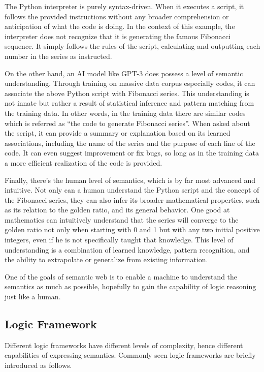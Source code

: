 The Python interpreter is purely syntax-driven. When it executes a script, it follows the provided instructions without any broader comprehension or anticipation of what the code is doing. In the context of this example, the interpreter does not recognize that it is generating the famous Fibonacci sequence. It simply follows the rules of the script, calculating and outputting each number in the series as instructed.

On the other hand, an AI model like GPT-3 does possess a level of semantic understanding. Through training on massive data corpus especially codes, it can associate the above Python script with Fibonacci series. This understanding is not innate but rather a result of statistical inference and pattern matching from the training data. In other words, in the training data there are similar codes which is referred as ``the code to generate Fibonacci series''. When asked about the script, it can provide a summary or explanation based on its learned associations, including the name of the series and the purpose of each line of the code. It can even suggest improvement or fix bugs, so long as in the training data a more efficient realization of the code is provided.

Finally, there's the human level of semantics, which is by far most advanced and intuitive. Not only can a human understand the Python script and the concept of the Fibonacci series, they can also infer its broader mathematical properties, such as its relation to the golden ratio, and its general behavior. One good at mathematics can intuitively understand that the series will converge to the golden ratio not only when starting with 0 and 1 but with any two initial positive integers, even if he is not specifically taught that knowledge. This level of understanding is a combination of learned knowledge, pattern recognition, and the ability to extrapolate or generalize from existing information.

One of the goals of semantic web is to enable a machine to understand the semantics as much as possible, hopefully to gain the capability of logic reasoning just like a human. 

\subsection{Logic Framework} \label{subsec:knowledgeandlogic}

Different logic frameworks have different levels of complexity, hence different capabilities of expressing semantics. Commonly seen logic frameworks are briefly introduced as follows.

